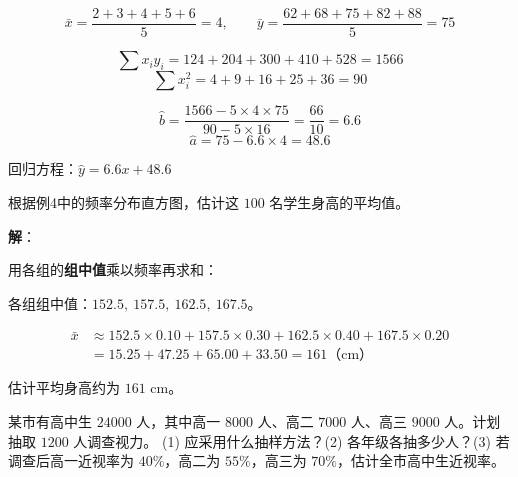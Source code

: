 \documentclass[12pt, a4paper]{ctexart}
\begin{document}
\[
\bar{x} = \frac{2+3+4+5+6}{5} = 4, \qquad \bar{y} = \frac{62+68+75+82+88}{5} = 75
\]

\[
\sum x_i y_i = 124 + 204 + 300 + 410 + 528 = 1566
\]
\[
\sum x_i^2 = 4 + 9 + 16 + 25 + 36 = 90
\]

\[
\hat{b} = \frac{1566 - 5 \times 4 \times 75}{90 - 5 \times 16} = \frac{66}{10} = 6.6
\]
\[
\hat{a} = 75 - 6.6 \times 4 = 48.6
\]

回归方程：$\hat{y} = 6.6x + 48.6$

\begin{center}
\end{center}

\begin{examplebox}[【例8】频率分布直方图中估计均值]
根据例4中的频率分布直方图，估计这 $100$ 名学生身高的平均值。
\end{examplebox}

\textbf{解}：

用各组的\textbf{组中值}乘以频率再求和：

各组组中值：$152.5,\ 157.5,\ 162.5,\ 167.5$。

\begin{align*}
\bar{x} &\approx 152.5 \times 0.10 + 157.5 \times 0.30 + 162.5 \times 0.40 + 167.5 \times 0.20 \\
&= 15.25 + 47.25 + 65.00 + 33.50 = 161 \text{（cm）}
\end{align*}

估计平均身高约为 $161$ cm。

\begin{examplebox}[【例9】综合：抽样与统计推断]
某市有高中生 $24000$ 人，其中高一 $8000$ 人、高二 $7000$ 人、高三 $9000$ 人。计划抽取 $1200$ 人调查视力。
(1) 应采用什么抽样方法？(2) 各年级各抽多少人？(3) 若调查后高一近视率为 $40\%$，高二为 $55\%$，高三为 $70\%$，估计全市高中生近视率。
\end{examplebox}
\end{document}
